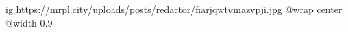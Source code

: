  
 
 
 
 

\ifcmt
  ig https://mrpl.city/uploads/posts/redactor/fiarjqwtvmazvpji.jpg
  @wrap center
  @width 0.9
\fi
